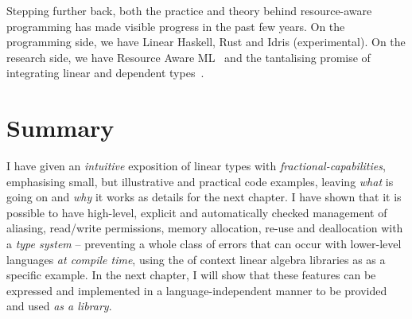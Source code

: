 Stepping further back, both the practice and theory behind resource-aware
programming has made visible progress in the past few years.  On the
programming side, we have Linear Haskell, Rust and Idris (experimental). On the
research side, we have Resource Aware ML~\cite{hoffmann} and the tantalising
promise of integrating linear and dependent types~\cite{atkey}.

\section{Summary}

I have given an \emph{intuitive} exposition of linear types with
\emph{fractional-capabilities}, emphasising small, but illustrative and
practical code examples, leaving \emph{what} is going on and \emph{why} it
works as details for the next chapter. I have shown that it is possible to have
high-level, explicit and automatically checked management of aliasing,
read/write permissions, memory allocation, re-use and deallocation with a
\emph{type system} -- preventing a whole class of errors that can occur with
lower-level languages \emph{at compile time}, using the of context linear
algebra libraries as as a specific example. In the next chapter, I will show
that these features can be expressed and implemented in a language-independent
manner to be provided and used \emph{as a library}.
